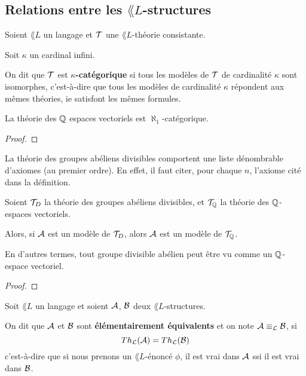 \documentclass[a4paper, 12pt]{report}
\begin{document}
\subsection{Relations entre les $\lang{L}$-structures}

\begin{definition} 
	Soient $\lang{L}$ un langage et $\mathcal{T}$ une $\lang{L}$-théorie consistante.

	Soit $\kappa$ un cardinal infini.

	On dit que $\mathcal{T}$ est \textbf{$\kappa$-catégorique} si tous les
	modèles de $\mathcal{T}$ de cardinalité $\kappa$ sont isomorphes,
	c'est-à-dire que tous les modèles de cardinalité $\kappa$ répondent aux
	mêmes théories, ie satisfont les mêmes formules.
\end{definition}

\begin{proposition}
	La théorie des $\mathbb{Q}$ espaces vectoriels est $\aleph_{1}$-catégorique.
\end{proposition}

\ifdefined\outputproof
\begin{proof}

\end{proof}
\fi

La théorie des groupes abéliens divisibles comportent une liste dénombrable
d'axiomes (au premier ordre). En effet, il faut citer, pour chaque $n$, l'axiome
cité dans la définition.

\begin{proposition}
	Soient $\mathcal{T}_{D}$ la théorie des groupes abéliens divisibles, et
	$\mathcal{T}_{\mathbb{Q}}$ la théorie des $\mathbb{Q}$-espaces vectoriels.

	Alors, si $\mathcal{A}$ est un modèle de $\mathcal{T}_{D}$, alors $\mathcal{A}$ est
	un modèle de $\mathcal{T}_{\mathbb{Q}}$.

	En d'autres termes, tout groupe divisible abélien peut être vu comme un
	$\mathbb{Q}$-espace vectoriel.
\end{proposition}

\ifdefined\outputproof
\begin{proof}

\end{proof}
\fi

\begin{definition} 
	Soit $\lang{L}$ un langage et soient $\mathcal{A}$, $\mathcal{B}$ deux
	$\lang{L}$-structures.

	On dit que $\mathcal{A}$ et $\mathcal{B}$ sont \textbf{élémentairement
	équivalents} et on note $\mathcal{A} \equiv_{\mathcal{L}} \mathcal{B}$, si
	\begin{equation}
		Th_{\mathcal{L}}(\mathcal{A}) = Th_{\mathcal{L}}(\mathcal{B})
	\end{equation}
	c'est-à-dire que si nous prenons un $\lang{L}$-énoncé $\phi$, il est vrai
	dans $\mathcal{A}$ ssi il est vrai dans $\mathcal{B}$.
\end{definition}
\end{document}
